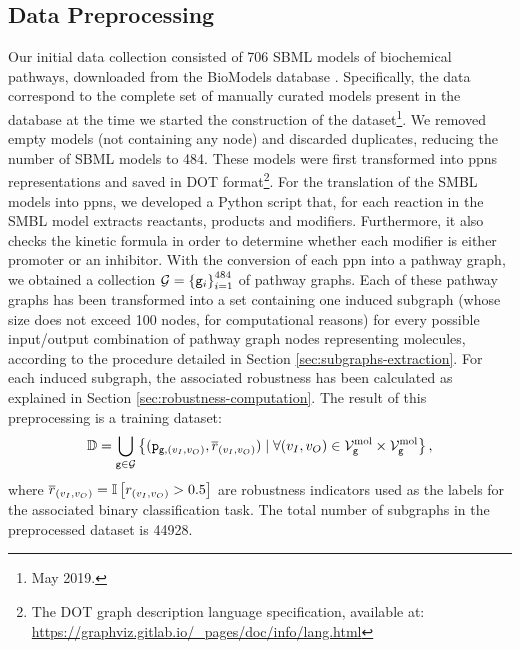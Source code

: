 \subsection{Data Preprocessing}\label{subsec:data-collection}
Our initial data collection consisted of 706 SBML models of biochemical pathways, downloaded from the BioModels database \cite{le2006biomodels}. Specifically, the data correspond to the complete set of manually curated models present in the database at the time we started the construction of the dataset\footnote{May 2019.}. We removed empty models (not containing any node) and discarded duplicates, reducing the number of SBML models to 484. These models were first transformed into \glspl{ppn} representations and saved in DOT format\footnote{The DOT graph description language specification, available at: \url{https://graphviz.gitlab.io/_pages/doc/info/lang.html}}. For the translation of the SMBL models into \glspl{ppn}, we developed a Python script that, for each reaction in the SMBL model extracts reactants, products and modifiers. Furthermore, it also checks the kinetic formula in order to determine whether each modifier is either promoter or an inhibitor. With the conversion of each \gls{ppn} into a pathway graph, we obtained a collection $\Cal{G} = \Set{\Graph{g}_i}_{i=1}^{484}$ of pathway graphs. Each of these pathway graphs has been transformed into a set containing one induced subgraph (whose size does not exceed 100 nodes, for computational reasons) for every possible input/output combination of pathway graph nodes representing molecules, according to the procedure detailed in Section \ref{sec:subgraphs-extraction}. For each induced subgraph, the associated robustness has been calculated as explained in Section \ref{sec:robustness-computation}. The result of this preprocessing is a training dataset:
$$\Data = \bigcup\limits_{\Graph{g} \in \Cal{G}} \Set{(\IndSubgraph, \Robustness) \mid \forall (v_I,v_O) \in \MolNodes{g} \times \MolNodes{g}},$$
where $\overline{r}_{(v_I,v_O)} = \mathbb{I}\left[ r_{(v_I,v_O)} > 0.5 \right]$ are robustness indicators used as the labels for the associated binary classification task. The total number of subgraphs in the preprocessed dataset is 44928.

